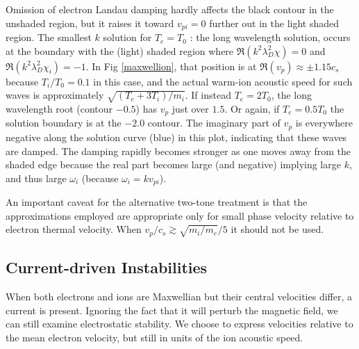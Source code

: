 \documentclass[12pt]{article}
\begin{document}
Omission of electron Landau damping hardly affects the black contour
in the unshaded region, but it raises it toward $v_{pi}=0$ further out
in the light shaded region. The smallest $k$ solution for $T_e=T_0$ :
the long wavelength solution, occurs at the boundary with the (light)
shaded region where $\Re (k^2\lambda_{D}^2 \chi)= 0$ and
$\Re (k^2\lambda_{D}^2 \chi_i)= -1$.  In Fig \ref{maxwellion}, that
position is at $\Re (v_p)\approx\pm 1.15 c_{s}$ because $T_i/T_0=0.1$
in this case, and the actual warm-ion acoustic speed for such waves is
approximately $\sqrt{(T_e+3T_i)/m_i}$. If instead $T_e=2T_0$, the long
wavelength root (contour $-0.5$) has $v_p$ just over $1.5$. Or again,
if $T_e=0.5T_0$ the solution boundary is at the $-2.0$ contour.  The
imaginary part of $v_p$ is everywhere negative along the solution
curve (blue) in this plot, indicating that these waves are damped. The
damping rapidly becomes stronger as one moves away from the shaded
edge because the real part becomes large (and negative) implying large
$k$, and thus large $\omega_i$ (because $\omega_i =kv_{pi}$).

An important caveat for the alternative two-tone treatment is that the
approximations employed are appropriate only for small phase velocity
relative to electron thermal velocity. When $v_p/c_s\gtrsim
\sqrt{m_i/m_e}/5$ it should not be used. 

\subsection{Current-driven Instabilities}

When both electrons and ions are Maxwellian but their central
velocities differ, a current is present. Ignoring the fact that it
will perturb the magnetic field, we can still examine electrostatic
stability. We choose to express velocities relative to the mean
electron velocity, but still in units of the ion acoustic speed. 
\end{document}

